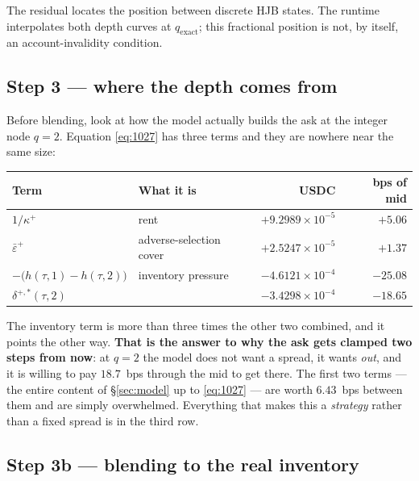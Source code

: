 \documentclass[11pt,a4paper]{article}
\newcommand{\epsb}{\bar{\varepsilon}}
\begin{document}
The residual locates the position between discrete HJB states. The runtime
interpolates both depth curves at $q_{\text{exact}}$; this fractional position
is not, by itself, an account-invalidity condition.

\subsection{Step 3 --- where the depth comes from}

Before blending, look at how the model actually builds the ask at the integer
node $q=2$. Equation \eqref{eq:1027} has three terms and they are nowhere near
the same size:

\begin{center}\small
\begin{tabular}{@{}llrr@{}}
\toprule
\textbf{Term} & \textbf{What it is} & \textbf{USDC} & \textbf{bps of mid} \\
\midrule
$1/\kappa^{+}$ & rent & $+9.2989\times10^{-5}$ & $+5.06$ \\
$\epsb^{+}$ & adverse-selection cover & $+2.5247\times10^{-5}$ & $+1.37$ \\
$-\bigl(h(\tau,1)-h(\tau,2)\bigr)$ & inventory pressure & $-4.6121\times10^{-4}$ & $-25.08$ \\
\midrule
$\delta^{+,*}(\tau,2)$ & & $-3.4298\times10^{-4}$ & $-18.65$ \\
\bottomrule
\end{tabular}
\end{center}

\noindent The inventory term is more than three times the other two combined, and it
points the other way. \textbf{That is the answer to why the ask gets clamped two
steps from now}: at $q=2$ the model does not want a spread, it wants \emph{out},
and it is willing to pay $18.7$~bps through the mid to get there. The first two
terms --- the entire content of \S\ref{sec:model} up to \eqref{eq:1027} --- are
worth $6.43$~bps between them and are simply overwhelmed. Everything that makes
this a \emph{strategy} rather than a fixed spread is in the third row.

\subsection{Step 3b --- blending to the real inventory}
\end{document}
